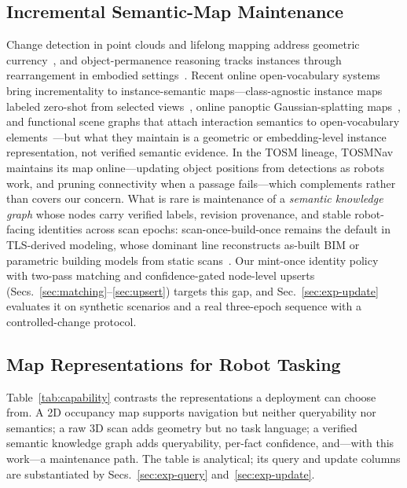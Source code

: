 \subsection{Incremental Semantic-Map Maintenance}
Change detection in point clouds and lifelong mapping address geometric
currency~\cite{fehr2017tsdf}, and object-permanence reasoning tracks
instances through rearrangement in embodied settings~\cite{wald2019rescan}.
Recent online open-vocabulary systems bring incrementality to
instance-semantic maps---class-agnostic instance maps labeled zero-shot
from selected views~\cite{deng2026ovimap}, online panoptic
Gaussian-splatting maps~\cite{zhai2026onlinepg}, and functional scene
graphs that attach interaction semantics to open-vocabulary
elements~\cite{zhang2025funcgraph}---but what they maintain is a
geometric or embedding-level instance representation, not verified
semantic evidence.
In the TOSM lineage, TOSMNav~\cite{joo2022fsom} maintains its map
online---updating object positions from detections as robots work, and
pruning connectivity when a passage fails---which complements rather than
covers our concern.
What is rare is maintenance of a \emph{semantic knowledge graph} whose
nodes carry verified labels, revision provenance, and stable robot-facing
identities across scan epochs:
scan-once-build-once remains the default in TLS-derived modeling, whose
dominant line reconstructs as-built BIM or parametric building models from
static scans~\cite{tang2010asbuilt,ochmann2016parametric}. Our
mint-once identity policy with two-pass matching and confidence-gated
node-level upserts (Secs.~\ref{sec:matching}--\ref{sec:upsert}) targets this
gap, and Sec.~\ref{sec:exp-update} evaluates it on synthetic scenarios and a
real three-epoch sequence with a controlled-change protocol.

\subsection{Map Representations for Robot Tasking}
Table~\ref{tab:capability} contrasts the representations a deployment can
choose from. A 2D occupancy map supports navigation but neither queryability
nor semantics; a raw 3D scan adds geometry but no task language; a verified
semantic knowledge graph adds queryability, per-fact confidence, and---with
this work---a maintenance path. The table is analytical; its query and
update columns are substantiated by Secs.~\ref{sec:exp-query}
and~\ref{sec:exp-update}.


